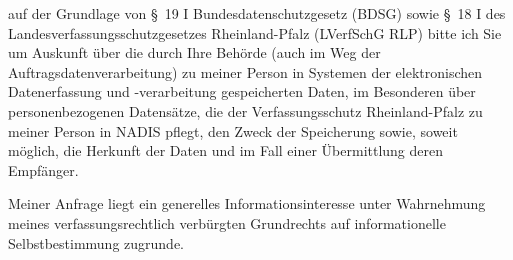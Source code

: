 auf der Grundlage von §~19 I Bundesdatenschutzgesetz (BDSG) sowie
§~18 I des Landesverfassungsschutzgesetzes Rheinland-Pfalz (LVerfSchG RLP)
bitte ich Sie um Auskunft über die durch Ihre Behörde (auch im Weg der Auftragsdatenverarbeitung)
zu meiner Person in Systemen der elektronischen Datenerfassung und -verarbeitung
gespeicherten Daten, im Besonderen über personenbezogenen Datensätze, die der
Verfassungsschutz Rheinland-Pfalz zu meiner Person in NADIS pflegt, den Zweck der
Speicherung sowie, soweit möglich, die Herkunft der Daten und im Fall einer
Übermittlung deren Empfänger.

Meiner Anfrage liegt ein generelles Informationsinteresse unter Wahrnehmung
meines verfassungsrechtlich verbürgten Grundrechts auf informationelle
Selbstbestimmung zugrunde.